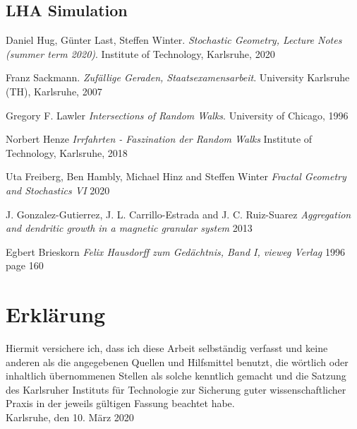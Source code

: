 \documentclass[12pt,a4paper]{scrartcl}
\numberwithin{equation}{subsection}
\newcommand{\1}{\mathbbm{1}}
\numberwithin{equation}{section}
\theoremstyle{definition}
\begin{document}
\subsection{LHA Simulation}


\newpage

\begin{thebibliography}{biblio}
\thispagestyle{empty}

Daniel Hug, Günter Last, Steffen Winter.
\emph{Stochastic Geometry, 	Lecture Notes (summer term 2020)}.
Institute of Technology, Karlsruhe, 2020

Franz Sackmann. 
\emph{Zufällige Geraden, Staatsexamensarbeit}.
University Karlsruhe (TH), Karlsruhe, 2007

Gregory F. Lawler
\emph{Intersections of Random Walks}.
University of Chicago, 1996

Norbert Henze
\emph{Irrfahrten - Faszination der Random Walks}
Institute of Technology, Karlsruhe, 2018

Uta Freiberg, Ben Hambly, Michael Hinz and Steffen Winter
\emph{Fractal Geometry and Stochastics VI}
2020

J. Gonzalez-Gutierrez, J. L. Carrillo-Estrada and J. C. Ruiz-Suarez
\emph{Aggregation and dendritic growth in a magnetic granular system}
2013

Egbert Brieskorn
\emph{Felix Hausdorff zum Gedächtnis, Band I, vieweg Verlag}
1996
page 160



\end{thebibliography}

\newpage
  
\thispagestyle{empty}

\vspace*{8cm}


\section*{Erklärung}

Hiermit versichere ich, dass ich diese Arbeit selbständig verfasst und keine anderen als die angegebenen Quellen und Hilfsmittel benutzt, die wörtlich oder inhaltlich übernommenen Stellen als solche kenntlich gemacht und die Satzung des Karlsruher Instituts für Technologie zur Sicherung guter wissenschaftlicher Praxis in der jeweils gültigen Fassung beachtet habe. \\[2ex] 

\noindent
Karlsruhe, den 10. März 2020\\[5ex] 
\end{document}
